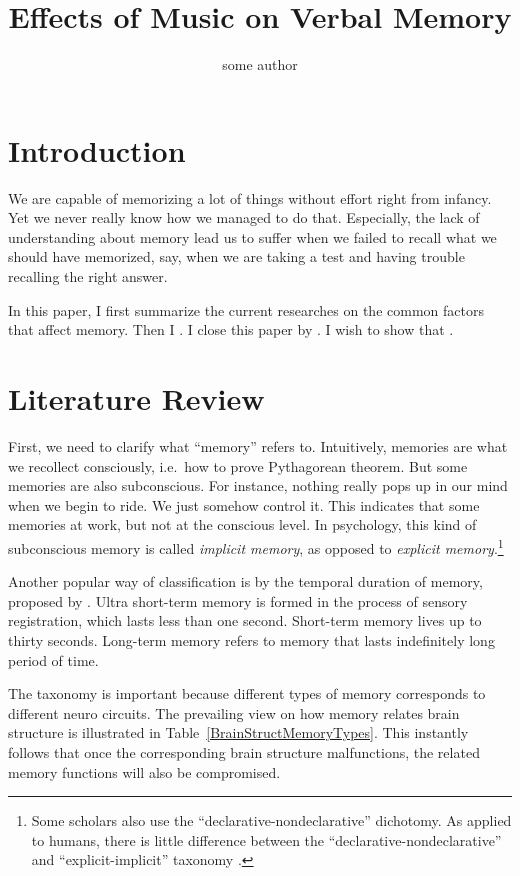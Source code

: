 \documentclass{article}
\title{Effects of Music on Verbal Memory}
\author{some author}
\begin{document}
\maketitle{}


\section{Introduction}

We are capable of memorizing a lot of things without effort right from infancy. Yet we never really know how we managed to do that. Especially, the lack of understanding about memory lead us to suffer when we failed to recall what we should have memorized, say, when we are taking a test and having trouble recalling the right answer. 

In this paper, I first summarize the current researches on the common factors that affect memory. Then I \hl{  }. I close this paper by \hl{  }. I wish to show that \hl{  }.

\section{Literature Review}

First, we need to clarify what ``memory'' refers to. Intuitively, memories are what we recollect consciously, i.e.\ how to prove Pythagorean theorem. But some memories are also subconscious. For instance, nothing really pops up in our mind when we begin to ride. We just somehow control it. This indicates that some memories at work, but not at the conscious level. In psychology, this kind of subconscious memory is called \textit{implicit memory}, as opposed to \textit{explicit memory}.\footnote{Some scholars also use the ``declarative-nondeclarative'' dichotomy. As applied to humans, there is little difference between the ``declarative-nondeclarative'' and ``explicit-implicit'' taxonomy \autocite[p.480]{kolbIntroductionBrainBehavior2019}.} 

Another popular way of classification is by the temporal duration of memory, proposed by \textcite{atkinsonHumanMemoryProposed1968}. Ultra short-term memory is formed in the process of sensory registration, which lasts less than one second. Short-term memory lives up to thirty seconds. Long-term memory refers to memory that lasts indefinitely long period of time. 

The taxonomy is important because different types of memory corresponds to different neuro circuits. The prevailing view on how memory relates brain structure is illustrated in Table~\ref{BrainStructMemoryTypes}. This instantly follows that once the corresponding brain structure malfunctions, the related memory functions will also be compromised. 
\end{document}
